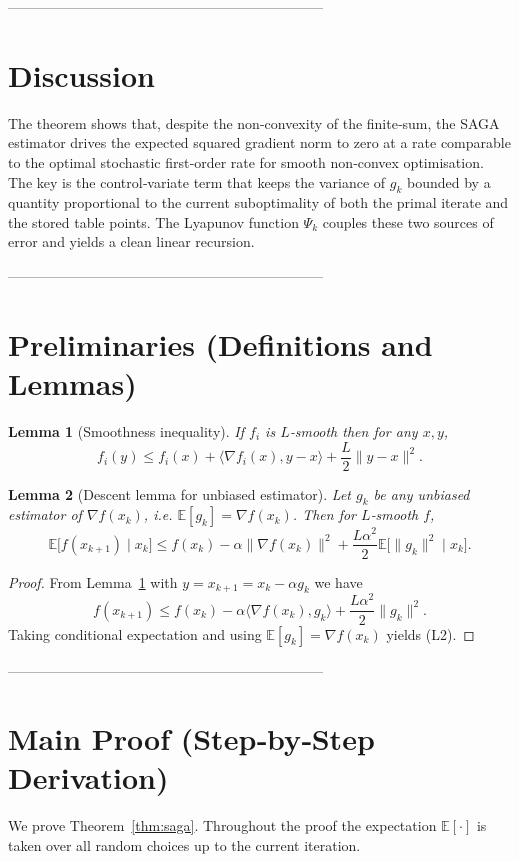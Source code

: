 \documentclass{article}
\newtheorem{lemma}{Lemma}
\newcommand{\E}{\mathbb{E}}
\begin{document}
--------------------------------------------------------------------

\section*{Discussion}
The theorem shows that, despite the non‑convexity of the finite‑sum,
the SAGA estimator drives the expected squared gradient norm to zero at a
rate comparable to the optimal stochastic first‑order rate for smooth
non‑convex optimisation. The key is the control‑variate term that keeps the
variance of $g_k$ bounded by a quantity proportional to the current suboptimality
of both the primal iterate and the stored table points. The Lyapunov function
$\Psi_k$ couples these two sources of error and yields a clean linear
recursion.

--------------------------------------------------------------------

\section*{Preliminaries (Definitions and Lemmas)}
\begin{lemma}[Smoothness inequality]\label{lem:smooth}
If $f_i$ is $L$‑smooth then for any $x,y$,
\[
f_i(y)\le f_i(x)+\langle\nabla f_i(x),y-x\rangle+\frac{L}{2}\|y-x\|^{2}.
\tag{L1}
\]
\end{lemma}
\begin{lemma}[Descent lemma for unbiased estimator]\label{lem:descent}
Let $g_k$ be any unbiased estimator of $\nabla f(x_k)$, i.e.
$\E[g_k]=\nabla f(x_k)$. Then for $L$‑smooth $f$,
\[
\E\!\bigl[f(x_{k+1})\mid x_k\bigr]
\le f(x_k)-\alpha\|\nabla f(x_k)\|^{2}
      +\frac{L\alpha^{2}}{2}\E\!\bigl[\|g_k\|^{2}\mid x_k\bigr].
\tag{L2}
\]
\end{lemma}
\begin{proof}
From Lemma~\ref{lem:smooth} with $y=x_{k+1}=x_k-\alpha g_k$ we have
\[
f(x_{k+1})\le f(x_k)-\alpha\langle\nabla f(x_k),g_k\rangle
               +\frac{L\alpha^{2}}{2}\|g_k\|^{2}.
\]
Taking conditional expectation and using $\E[g_k]=\nabla f(x_k)$ yields (L2).
\end{proof}

--------------------------------------------------------------------

\section*{Main Proof (Step‑by‑Step Derivation)}
We prove Theorem~\ref{thm:saga}. Throughout the proof the expectation
$\E[\cdot]$ is taken over all random choices up to the current iteration.
\end{document}
